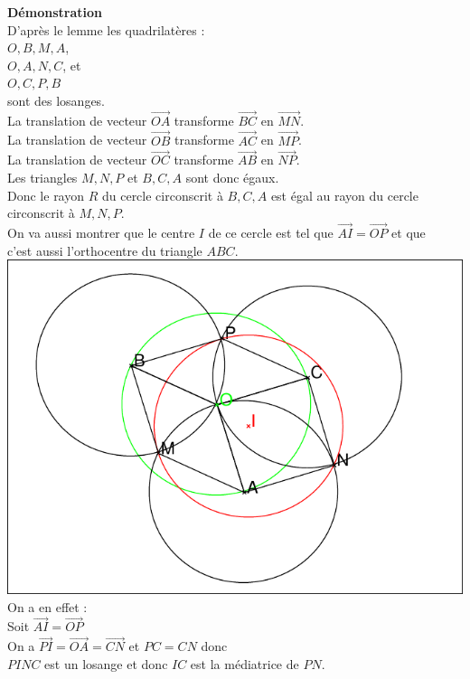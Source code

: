 \documentclass[a4paper,11pt]{book}
\begin{document}
{\bf D\'emonstration}\\
D'apr\`es le lemme les quadrilat\`eres :\\
$O,B,M,A$,\\
 $O,A,N,C$, et \\ 
$O,C,P,B$ \\
sont des losanges.\\ 
La translation de vecteur $\overrightarrow{OA}$ transforme  
$\overrightarrow{BC}$ en $\overrightarrow{MN}$.\\
La translation de vecteur $\overrightarrow{OB}$ transforme  
$\overrightarrow{AC}$ en $\overrightarrow{MP}$.\\
La translation de vecteur $\overrightarrow{OC}$ transforme  
$\overrightarrow{AB}$ en $\overrightarrow{NP}$.\\
Les triangles $M,N,P$ et $B,C,A$ sont donc \'egaux.\\
Donc le rayon $R$ du cercle circonscrit \`a  $B,C,A$ est \'egal au rayon du 
cercle circonscrit \`a  $M,N,P$.\\
On va aussi montrer que le centre $I$ de ce cercle est tel que 
$\overrightarrow{AI}= \overrightarrow{OP}$ et que \\
c'est aussi l'orthocentre du triangle $ABC$.\\
\includegraphics[width=\textwidth]{casjohn}
On a en effet :\\
Soit $\overrightarrow{AI}= \overrightarrow{OP}$\\
 On a $\overrightarrow{PI}= \overrightarrow{OA}= \overrightarrow{CN}$ et
$PC=CN$ donc \\
 $PINC$ est un losange et donc $IC$ est la m\'ediatrice de $PN$.\\
\end{document}
